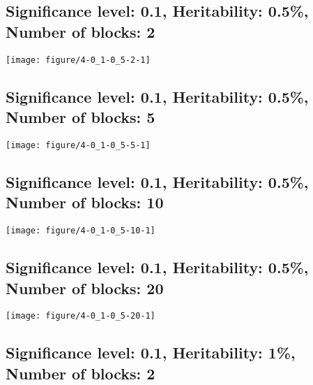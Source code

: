 \documentclass[11pt,letter]{article}\usepackage[]{graphicx}\usepackage[]{color}
\makeatletter
\def\maxwidth{ %
  \ifdim\Gin@nat@width>\linewidth
    \linewidth
  \else
    \Gin@nat@width
  \fi
}
\newenvironment{knitrout}{}{} %
\makeatother
\begin{document}
\newpage
\subsection{Significance level: 0.1, Heritability: 0.5\%, Number of blocks: 2}

\begin{knitrout}
\color{fgcolor}
\texttt{[image: figure/4-0\_1-0\_5-2-1]} 

\end{knitrout}

\newpage
\subsection{Significance level: 0.1, Heritability: 0.5\%, Number of blocks: 5}

\begin{knitrout}
\color{fgcolor}
\texttt{[image: figure/4-0\_1-0\_5-5-1]} 

\end{knitrout}

\newpage
\subsection{Significance level: 0.1, Heritability: 0.5\%, Number of blocks: 10}

\begin{knitrout}
\color{fgcolor}
\texttt{[image: figure/4-0\_1-0\_5-10-1]} 

\end{knitrout}

\newpage
\subsection{Significance level: 0.1, Heritability: 0.5\%, Number of blocks: 20}

\begin{knitrout}
\color{fgcolor}
\texttt{[image: figure/4-0\_1-0\_5-20-1]} 

\end{knitrout}

\newpage
\subsection{Significance level: 0.1, Heritability: 1\%, Number of blocks: 2}
\end{document}
